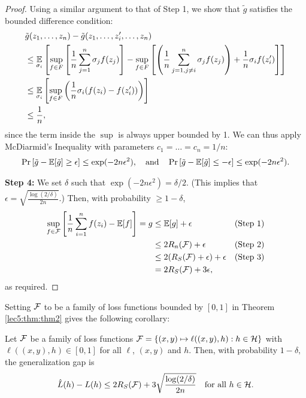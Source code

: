 \begin{proof}
Using a similar argument to that of Step 1, we show that $\tilde g$ satisfies the bounded difference condition:
\begin{align}
    &\tilde g(z_1, \dots, z_n) - \tilde g(z_1, \dots, z_i', \dots, z_n) \nonumber \\
    &\leq \operatorname*{\mathbb{E}}_{\sigma_i} \left[\sup_{f\in F} \left[ \frac{1}{n} \sum^{n}_{j=1} \sigma_j f(z_j) \right] - \sup_{f\in F} \left[ \left(\frac{1}{n} \sum^{n}_{j=1, j \neq i} \sigma_j f(z_j)\right) + \frac{1}{n} \sigma_if(z_i')\right]\right]\\
    &\leq \operatorname*{\mathbb{E}}_{\sigma_i}\left[\sup_{f\in F} \left(\frac{1}{n} \sigma_i(f(z_i) - f(z_i'))\right)\right] \\
    &\leq \frac{1}{n},
\end{align}
since the term inside the $\sup$ is always upper bounded by 1. We can thus apply McDiarmid's Inequality with parameters $c_1 = \dots = c_n = 1/n$:
\begin{align}
    \Pr\left[ \tilde g - \operatorname*{\mathbb{E}}[\tilde g] \geq \epsilon \right] \leq \exp(-2n \epsilon^2), \quad\text{and}\quad
    \Pr\left[ \tilde g - \operatorname*{\mathbb{E}}[\tilde g] \leq -\epsilon \right] \leq \exp(-2n \epsilon^2).
\end{align}

\textbf{Step 4:} We set $\delta$ such that $\exp(-2n \epsilon^2) = \delta/2$. (This implies that $\epsilon = \sqrt{\frac{\log(2/\delta)}{2n}}$.) Then, with probability $\geq 1 - \delta$,
\begin{align}
    \sup_{f\in \mathcal F} \left[ \frac{1}{n} \sum^n_{i=1} f(z_i) - \operatorname*{\mathbb{E}}[f]\right] = g &\leq \operatorname*{\mathbb{E}}[g] + \epsilon &\text{(Step 1)} \\
    &\leq 2R_n(\mathcal F) + \epsilon &\text{(Step 2)} \\
    &\leq 2(R_S(\mathcal F) + \epsilon) + \epsilon &\text{(Step 3)} \\
    &= 2R_S(\mathcal F) + 3\epsilon,
\end{align}
as required.
\end{proof}

Setting $\mathcal F$ to be a family of loss functions bounded by $[0,1]$ in Theorem \ref{lec5:thm:thm2} gives the following corollary:
\begin{corollary}\label{lec6:cor:ggap-rsbound}
Let $\mathcal F$ be a family of loss functions $\mathcal F = \left\{ (x,y) \mapsto \ell((x,y),h): h \in \mathcal H \right\}$ with $\ell((x,y), h) \in [0,1]$ for all $\ell$, $(x,y)$ and $h$. Then, with probability $1-\delta,$ the generalization gap is
    \begin{equation}\label{lec6:eqn:ggap-rsbound}
        \hat{L}(h) - L(h) \leq 2R_S(\mathcal F) + 3\sqrt{\frac{\log(2/\delta)}{2n}} \quad \text{for all } h\in \mathcal H.
    \end{equation}
\end{corollary}

